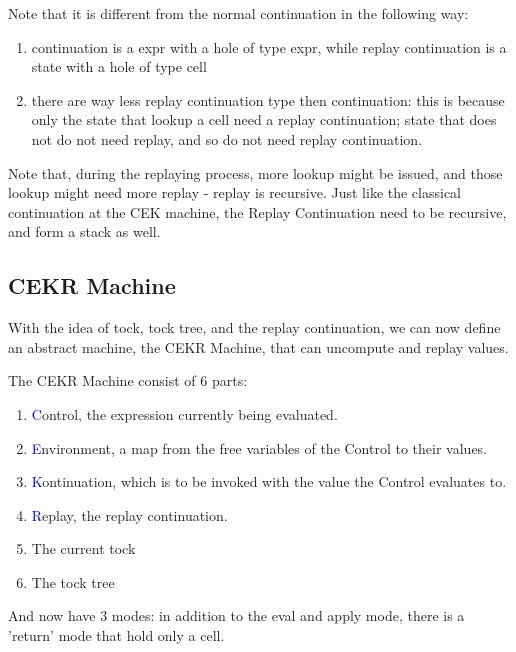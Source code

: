 Note that it is different from the normal continuation in the following way:
\begin{enumerate}
	\item continuation is a expr with a hole of type expr, while replay continuation is a state with a hole of type cell
	\item there are way less replay continuation type then continuation: this is because only the state that lookup a cell need a replay continuation; state that does not do not need replay, and so do not need replay continuation.
\end{enumerate}

Note that, during the replaying process, more lookup might be issued, and those lookup might need more replay - replay is recursive. Just like the classical continuation at the CEK machine, the Replay Continuation need to be recursive, and form a stack as well.

\subsection{CEKR Machine}
With the idea of tock, tock tree, and the replay continuation, we can now define an abstract machine, the CEKR Machine, that can uncompute and replay values.

The CEKR Machine consist of 6 parts:
\begin{enumerate}
	\item \textcolor{blue}{C}ontrol, the expression currently being evaluated.
	\item \textcolor{blue}{E}nvironment, a map from the free variables of the Control to their values.
	\item \textcolor{blue}{K}ontinuation, which is to be invoked with the value the Control evaluates to.
	\item \textcolor{blue}{R}eplay, the replay continuation.
	\item The current tock
	\item The tock tree
\end{enumerate}
And now have 3 modes: in addition to the eval and apply mode, there is a 'return' mode that hold only a cell.

